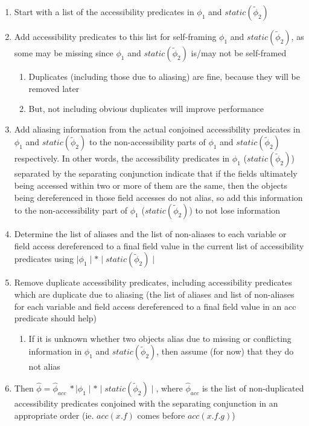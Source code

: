 \documentclass {article}
\newcommand{\fphi}{\widehat{\phi}}
\newcommand{\tphi}{\widetilde{\phi}}
\begin{document}
\begin{enumerate}
\item Start with a list of the accessibility predicates in $\phi_1$ and $static(\tphi_2)$
\item Add accessibility predicates to this list for self-framing $\phi_1$ and $static(\tphi_2)$, as some may be missing since $\phi_1$ and $static(\tphi_2)$ is/may not be self-framed
	\begin{enumerate}
	\item Duplicates (including those due to aliasing) are fine, because they will be removed later
	\item But, not including obvious duplicates will improve performance
	\end{enumerate}
\item Add aliasing information from the actual conjoined accessibility predicates in $\phi_1$ and $static(\tphi_2)$ to the non-accessibility parts of $\phi_1$ and $static(\tphi_2)$ respectively. In other words, the accessibility predicates in $\phi_1$ ($static(\tphi_2)$) separated by the separating conjunction indicate that if the fields ultimately being accessed within two or more of them are the same, then the objects being dereferenced in those field accesses do not alias, so add this information to the non-accessibility part of $\phi_1$ ($static(\tphi_2)$) to not lose information
\item Determine the list of aliases and the list of non-aliases to each variable or field access dereferenced to a final field value in the current list of accessibility predicates using $\mid \phi_1 \mid \ast \mid static(\tphi_2) \mid$
\item Remove duplicate accessibility predicates, including accessibility predicates which are duplicate due to aliasing (the list of aliases and list of non-aliases for each variable and field access dereferenced to a final field value in an acc predicate should help)
	\begin{enumerate}
	\item If it is unknown whether two objects alias due to missing or conflicting information in $\phi_1$ and $static(\tphi_2)$, then assume (for now) that they do not alias
	\end{enumerate}
\item Then $\fphi = \fphi_{acc} \ \ast \mid \phi_1 \mid \ast \mid static(\tphi_2) \mid$, where $\fphi_{acc}$ is the list of non-duplicated accessibility predicates conjoined with the separating conjunction in an appropriate order (ie. $acc(x.f)$ comes before $acc(x.f.g)$)
\end{enumerate}
\end{document}
